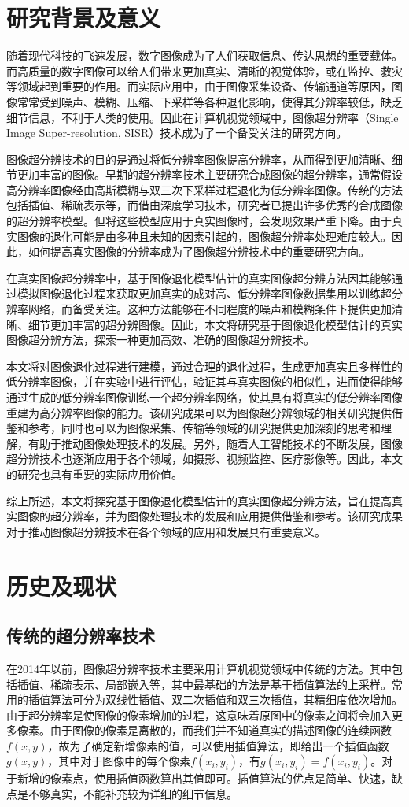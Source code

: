 \section{研究背景及意义}
随着现代科技的飞速发展，数字图像成为了人们获取信息、传达思想的重要载体。而高质量的数字图像可以给人们带来更加真实、清晰的视觉体验，或在监控、救灾等领域起到重要的作用。而实际应用中，由于图像采集设备、传输通道等原因，图像常常受到噪声、模糊、压缩、下采样等各种退化影响，使得其分辨率较低，缺乏细节信息，不利于人类的使用。因此在计算机视觉领域中，图像超分辨率（Single Image Super-resolution, SISR）技术成为了一个备受关注的研究方向。

图像超分辨技术的目的是通过将低分辨率图像提高分辨率，从而得到更加清晰、细节更加丰富的图像。早期的超分辨率技术主要研究合成图像的超分辨率，通常假设高分辨率图像经由高斯模糊与双三次下采样过程退化为低分辨率图像。传统的方法包括插值、稀疏表示等，而借由深度学习技术，研究者已提出许多优秀的合成图像的超分辨率模型。但将这些模型应用于真实图像时，会发现效果严重下降。由于真实图像的退化可能是由多种且未知的因素引起的，图像超分辨率处理难度较大。因此，如何提高真实图像的分辨率成为了图像超分辨技术中的重要研究方向。

在真实图像超分辨率中，基于图像退化模型估计的真实图像超分辨方法因其能够通过模拟图像退化过程来获取更加真实的成对高、低分辨率图像数据集用以训练超分辨率网络，而备受关注。这种方法能够在不同程度的噪声和模糊条件下提供更加清晰、细节更加丰富的超分辨图像。因此，本文将研究基于图像退化模型估计的真实图像超分辨方法，探索一种更加高效、准确的图像超分辨技术。

本文将对图像退化过程进行建模，通过合理的退化过程，生成更加真实且多样性的低分辨率图像，并在实验中进行评估，验证其与真实图像的相似性，进而使得能够通过生成的低分辨率图像训练一个超分辨率网络，使其具有将真实的低分辨率图像重建为高分辨率图像的能力。该研究成果可以为图像超分辨领域的相关研究提供借鉴和参考，同时也可以为图像采集、传输等领域的研究提供更加深刻的思考和理解，有助于推动图像处理技术的发展。另外，随着人工智能技术的不断发展，图像超分辨技术也逐渐应用于各个领域，如摄影、视频监控、医疗影像等。因此，本文的研究也具有重要的实际应用价值。

综上所述，本文将探究基于图像退化模型估计的真实图像超分辨方法，旨在提高真实图像的超分辨率，并为图像处理技术的发展和应用提供借鉴和参考。该研究成果对于推动图像超分辨技术在各个领域的应用和发展具有重要意义。
\section{历史及现状}
\subsection{传统的超分辨率技术}
在2014年以前，图像超分辨率技术主要采用计算机视觉领域中传统的方法。其中包括插值、稀疏表示、局部嵌入等，其中最基础的方法是基于插值算法的上采样。常用的插值算法可分为双线性插值、双二次插值和双三次插值，其精细度依次增加。由于超分辨率是使图像的像素增加的过程，这意味着原图中的像素之间将会加入更多像素。由于图像的像素是离散的，而我们并不知道真实的描述图像的连续函数$f(x,y)$，故为了确定新增像素的值，可以使用插值算法，即给出一个插值函数$g(x,y)$，其中对于图像中的每个像素$f(x_i,y_i)$，有$g(x_i,y_i)=f(x_i,y_i)$。对于新增的像素点，使用插值函数算出其值即可。插值算法的优点是简单、快速，缺点是不够真实，不能补充较为详细的细节信息。

